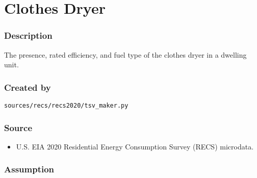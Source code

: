 \section{Clothes Dryer}\label{clothes_dryer}

\subsubsection{Description}\label{description-15}

The presence, rated efficiency, and fuel type of the clothes dryer in a
dwelling unit.

\subsubsection{Created by}\label{created-by-15}

\texttt{sources/recs/recs2020/tsv\_maker.py}

\subsubsection{Source}\label{source-15}

\begin{itemize}
 
\item
  U.S. EIA 2020 Residential Energy Consumption Survey (RECS) microdata.
\end{itemize}

\subsubsection{Assumption}\label{assumption-6}


